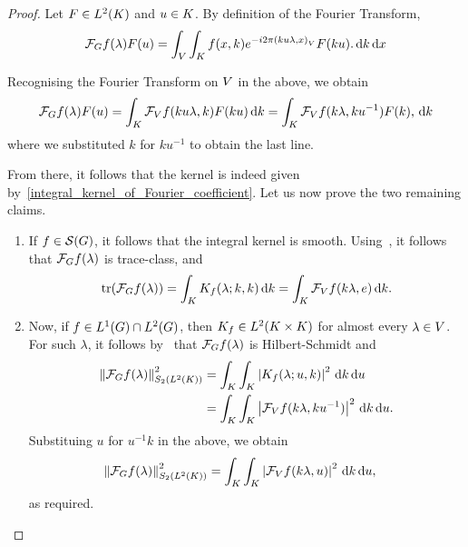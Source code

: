 \begin{proof}
    Let $F \in \Lebesgue{2}\CompactGroup$ and $u \in \CompactGroup$.
    By definition of the Fourier Transform,
    \begin{align*}
        \Fourier f(\lambda) F(u) =
        \int_\VectorSpace
            \int_\CompactGroup
                f(x, k) \e^{-\i \turn \ip{k u \lambda}{x}} F(k u).
            \dd k
        \dd x
    \end{align*}

    Recognising the Fourier Transform on $\VectorSpace$ in the above, we obtain
    \begin{align*}
        \Fourier f(\lambda) F(u) =
        \int_\CompactGroup
            \Fourier[\VectorSpace] f(k u \lambda, k) F(k u)
        \dd k
        =
        \int_\CompactGroup
            \Fourier[\VectorSpace] f(k \lambda, k u^{-1}) F(k),
        \dd k
    \end{align*}
    where we substituted $k$ for $k u^{-1}$ to obtain the last line.

    From there, it follows that the kernel is indeed given by~\eqref{integral_kernel_of_Fourier_coefficient}.
    Let us now prove the two remaining claims.

    \begin{enumerate}
        \item If $f \in \Schwartz\Group$, it follows that the integral kernel is smooth.
            Using~\cite[Corollary 4.1]{DelgadoRuzhansky14}, it follows that $\Fourier f(\lambda)$ is trace-class, and
            \begin{align*}
            \tr(\Fourier f(\lambda))
            = \int_\CompactGroup K_f(\lambda; k, k) \dd k
            = \int_\CompactGroup \Fourier[\VectorSpace] f(k \lambda, e) \dd k.
        \end{align*}
    \item Now, if $f \in \Lebesgue{1}\Group \cap \Lebesgue{2}\Group$,
        then $K_{f} \in \Lebesgue{2}{\CompactGroup \times \CompactGroup}$ for almost every $\lambda \in \VectorSpace$.
        For such $\lambda$, it follows by~\cite[Theorem VI.23]{Reed72} that $\Fourier f(\lambda)$ is Hilbert-Schmidt and
        \begin{align*}
            \norm[\SchattenClasses{2}{\Lebesgue{2}\CompactGroup}]{\Fourier f(\lambda)}^2
            &= \int_\CompactGroup \int_\CompactGroup \abs{K_f(\lambda; u, k)}^2 \dd k \dd u\\
            &= \int_\CompactGroup \int_\CompactGroup \abs{\Fourier[\VectorSpace] f(k \lambda, k u^{-1})}^2 \dd k \dd u.
        \end{align*}
        Substituing $u$ for $u^{-1} k$ in the above, we obtain
        \begin{align*}
            \norm[\SchattenClasses{2}{\Lebesgue{2}\CompactGroup}]{\Fourier f(\lambda)}^2
            &= \int_\CompactGroup \int_\CompactGroup \abs{\Fourier[\VectorSpace] f(k \lambda, u)}^2 \dd k \dd u,
        \end{align*}
        as required.
    \end{enumerate}
\end{proof}

